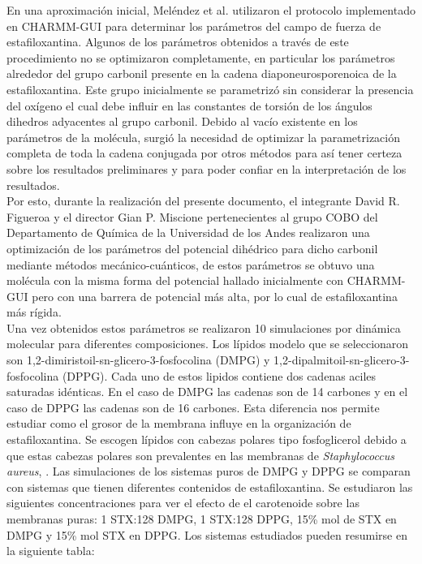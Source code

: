En una aproximaci\'{o}n inicial, Mel\'{e}ndez et al. \cite{Melendez-Delgado2018StudyingBilayers} utilizaron el protocolo implementado en CHARMM-GUI \cite{Brooks2009} para determinar los par\'{a}metros del campo de fuerza de estafiloxantina. Algunos de los par\'{a}metros obtenidos a trav\'{e}s de este procedimiento no se optimizaron completamente, en particular los par\'{a}metros alrededor del grupo carbonil presente en la cadena diaponeurosporenoica de la estafiloxantina. Este grupo inicialmente se parametriz\'{o} sin considerar la presencia del ox\'{i}geno el cual debe influir en las constantes de torsi\'{o}n de los \'{a}ngulos dihedros adyacentes al grupo carbonil. Debido al vac\'{i}o existente en los par\'{a}metros de la mol\'{e}cula, surgi\'{o} la necesidad de optimizar la parametrizaci\'{o}n completa de toda la cadena conjugada por otros m\'{e}todos para as\'{i} tener certeza sobre los resultados preliminares y para poder confiar en la interpretaci\'{o}n de los resultados.\\

Por esto, durante la realizaci\'{o}n del presente documento, el integrante David R. Figueroa y el director Gian P. Miscione pertenecientes al grupo COBO del Departamento de Qu\'{i}mica de la Universidad de los Andes realizaron una optimizaci\'{o}n de los par\'{a}metros del potencial dih\'{e}drico para dicho carbonil mediante m\'{e}todos mec\'{a}nico-cu\'{a}nticos, de estos par\'{a}metros se obtuvo una mol\'{e}cula con la misma forma del potencial hallado inicialmente con CHARMM-GUI pero con una barrera de potencial m\'{a}s alta, por lo cual de estafiloxantina m\'{a}s r\'{i}gida. \\

Una vez obtenidos estos par\'{a}metros se realizaron 10 simulaciones por din\'{a}mica molecular para diferentes composiciones. Los l\'{i}pidos modelo que se seleccionaron son 1,2-dimiristoil-sn-glicero-3-fosfocolina (DMPG) y 1,2-dipalmitoil-sn-glicero-3-fosfocolina (DPPG). Cada uno de estos lipidos contiene dos cadenas aciles saturadas id\'{e}nticas. En el caso de DMPG las cadenas son de 14 carbones y en el caso de DPPG las cadenas son de 16 carbones. Esta diferencia nos permite estudiar como el grosor de la membrana influye en la organizaci\'{o}n de estafiloxantina. Se escogen l\'{i}pidos con cabezas polares tipo fosfoglicerol debido a que estas cabezas polares son prevalentes en las membranas de \textit{Staphylococcus aureus}, \cite{Sohlenkamp2015BacterialPathways}. Las simulaciones de los sistemas puros de DMPG y DPPG se comparan con sistemas que tienen diferentes contenidos de estafiloxantina. Se estudiaron las siguientes concentraciones para ver el efecto de el carotenoide sobre las membranas puras: 1 STX:128 DMPG, 1 STX:128 DPPG, 15\% mol de STX en DMPG y 15\% mol STX en DPPG. Los sistemas estudiados pueden resumirse en la siguiente tabla:\\

